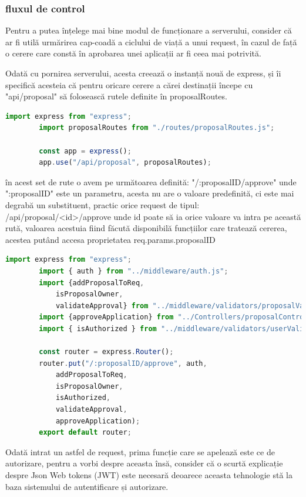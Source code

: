 \documentclass[12pt,a4paper,hidelinks]{report}
\theoremstyle{definition}
\theoremstyle{remark}
\begin{document}
    \subsubsection{fluxul de control}
    Pentru a putea înțelege mai bine modul de funcționare a serverului, consider că ar fi utilă urmărirea cap-coadă a ciclului de viață a unui request, 
    în cazul de față o cerere care constă în aprobarea unei aplicații ar fi ceea mai potrivită.
    
    Odată cu pornirea serverului, acesta creează o instanță nouă de express, și îi specifică acesteia că pentru oricare cerere a cărei 
    destinații începe cu "api/proposal" să folosească rutele definite în proposalRoutes.
    \begin{lstlisting}[language=Javascript]
        import express from "express";
        import proposalRoutes from "./routes/proposalRoutes.js";

        const app = express();
        app.use("/api/proposal", proposalRoutes);
    \end{lstlisting}
    în acest set de rute o avem pe următoarea definită: "/:proposalID/approve" unde ":proposalID" este un parametru, acesta nu are o valoare predefinită,
    ci este mai degrabă un substituent, practic orice request de tipul: /api/proposal/<id>/approve  
    unde id poate să ia orice valoare va intra pe această rută, valoarea acestuia fiind făcută disponibilă funcțiilor care
    tratează cererea, acestea putând accesa proprietatea req.params.proposalID
    \begin{lstlisting}[language=Javascript]
        import express from "express";
        import { auth } from "../middleware/auth.js";
        import {addProposalToReq,
            isProposalOwner,
            validateApproval} from "../middleware/validators/proposalValidator.js";
        import {approveApplication} from "../Controllers/proposalController.js";
        import { isAuthorized } from "../middleware/validators/userValidator.js";

        const router = express.Router();
        router.put("/:proposalID/approve", auth,
            addProposalToReq,
            isProposalOwner,
            isAuthorized,
            validateApproval,
            approveApplication);
        export default router;
    \end{lstlisting}
    Odată intrat un astfel de request, prima funcție care se apelează este ce de autorizare,
    pentru a vorbi despre aceasta însă, consider că o scurtă explicație despre Json Web tokens (JWT)
    este necesară deoarece aceasta tehnologie stă la baza sistemului de autentificare și autorizare.
    
\end{document}
